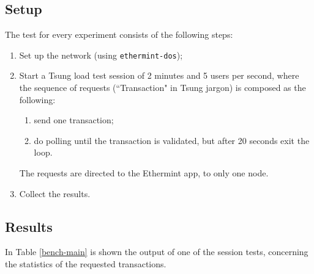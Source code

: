 \documentclass[]{article}
\begin{document}
\subsection{Setup}
The test for every experiment consists of the following steps:
\begin{enumerate}
	\item Set up the network (using \texttt{ethermint-dos});
	\item Start a Tsung load test session of 2 minutes and 5 users per second, where the sequence of requests (``Transaction" in Tsung jargon) is composed as the following:
	\begin{enumerate}
		\item send one transaction;
		\item do polling until the transaction is validated, but after 20 seconds exit the loop.
	\end{enumerate}
	The requests are directed to the Ethermint app, to only one node.
	\item Collect the results.
\end{enumerate}

\subsection{Results}

In Table \ref{bench-main} is shown the output of one of the session tests,  concerning the statistics of the requested transactions. 
\end{document}
